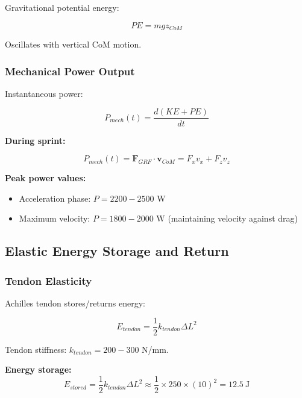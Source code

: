 Gravitational potential energy:

\begin{equation}
PE = m g z_{CoM}
\label{eq:potential_energy}
\end{equation}

Oscillates with vertical CoM motion.

\subsubsection{Mechanical Power Output}

Instantaneous power:

\begin{equation}
P_{mech}(t) = \frac{d(KE + PE)}{dt}
\label{eq:mechanical_power}
\end{equation}

\textbf{During sprint:}

\begin{equation}
P_{mech}(t) = \mathbf{F}_{GRF} \cdot \mathbf{v}_{CoM} = F_x v_x + F_z v_z
\label{eq:grf_power}
\end{equation}

\textbf{Peak power values:}
\begin{itemize}
\item Acceleration phase: $P = 2200-2500$ W
\item Maximum velocity: $P = 1800-2000$ W (maintaining velocity against drag)
\end{itemize}

\subsection{Elastic Energy Storage and Return}

\subsubsection{Tendon Elasticity}

Achilles tendon stores/returns energy:

\begin{equation}
E_{tendon} = \frac{1}{2} k_{tendon} \Delta L^2
\label{eq:tendon_energy}
\end{equation}

Tendon stiffness: $k_{tendon} = 200-300$ N/mm.

\textbf{Energy storage:}
\begin{equation}
E_{stored} = \frac{1}{2} k_{tendon} \Delta L^2 \approx \frac{1}{2} \times 250 \times (10)^2 = 12.5~\text{J}
\label{eq:tendon_storage}
\end{equation}

